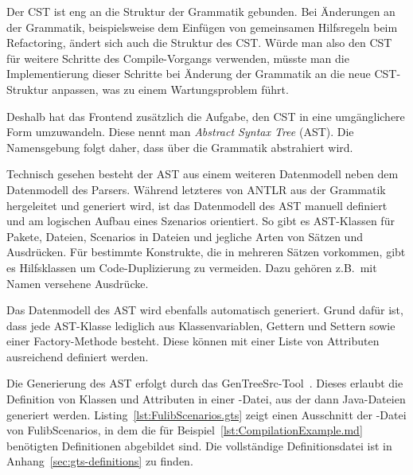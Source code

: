 Der CST ist eng an die Struktur der Grammatik gebunden.
Bei Änderungen an der Grammatik, beispielsweise dem Einfügen von gemeinsamen Hilfsregeln beim Refactoring,
ändert sich auch die Struktur des CST\@.
Würde man also den CST für weitere Schritte des Compile-Vorgangs verwenden,
müsste man die Implementierung dieser Schritte bei Änderung der Grammatik an die neue CST-Struktur anpassen,
was zu einem Wartungsproblem führt.

Deshalb hat das Frontend zusätzlich die Aufgabe, den CST in eine umgänglichere Form umzuwandeln.
Diese nennt man \emph{Abstract Syntax Tree} (AST).
Die Namensgebung folgt daher, dass über die Grammatik abstrahiert wird.

Technisch gesehen besteht der AST aus einem weiteren Datenmodell neben dem Datenmodell des Parsers.
Während letzteres von ANTLR aus der Grammatik hergeleitet und generiert wird,
ist das Datenmodell des AST manuell definiert und am logischen Aufbau eines Szenarios orientiert.
So gibt es AST-Klassen für Pakete, Dateien, Scenarios in Dateien und jegliche Arten von Sätzen und Ausdrücken.
Für bestimmte Konstrukte, die in mehreren Sätzen vorkommen, gibt es Hilfsklassen um Code-Duplizierung zu vermeiden.
Dazu gehören z.B.\ mit Namen versehene Ausdrücke.

Das Datenmodell des AST wird ebenfalls automatisch generiert.
Grund dafür ist, dass jede AST-Klasse lediglich aus Klassenvariablen, Gettern und Settern sowie einer Factory-Methode besteht.
Diese können mit einer Liste von Attributen ausreichend definiert werden.

Die Generierung des AST erfolgt durch das GenTreeSrc-Tool~\cite{gentreesrc}.
Dieses erlaubt die Definition von Klassen und Attributen in einer -Datei,
aus der dann Java-Dateien generiert werden.
Listing~\ref{lst:FulibScenarios.gts} zeigt einen Ausschnitt der -Datei von FulibScenarios,
in dem die für Beispiel~\ref{lst:CompilationExample.md} benötigten Definitionen abgebildet sind.
Die vollständige Definitionsdatei ist in Anhang~\ref{sec:gts-definitions} zu finden.


